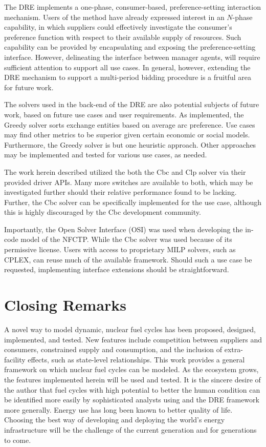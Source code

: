 The DRE implements a one-phase, consumer-based, preference-setting interaction
mechanism. Users of the method have already expressed interest in an $N$-phase
capability, in which suppliers could effectively investigate the consumer's
preference function with respect to their available supply of resources. Such
capability can be provided by encapsulating and exposing the preference-setting
interface. However, delineating the interface between manager agents, will
require sufficient attention to support all use cases. In general, however,
extending the DRE mechanism to support a multi-period bidding procedure is a
fruitful area for future work.

The solvers used in the back-end of the DRE are also potential subjects of
future work, based on future use cases and user requirements. As implemented,
the Greedy solver sorts exchange entities based on average arc preference. Use
cases may find other metrics to be superior given certain economic or social
models. Furthermore, the Greedy solver is but one heuristic approach. Other
approaches may be implemented and tested for various use cases, as needed.

The work herein described utilized the both the Cbc and Clp solver via their
provided driver APIs. Many more switches are available to both, which may be
investigated further should their relative performance found to be
lacking. Further, the Cbc solver can be specifically implemented for the \Cyclus
use case, although this is highly discouraged by the Cbc development community. 

Importantly, the Open Solver Interface (OSI) was used when developing the
in-code model of the NFCTP. While the Cbc solver was used because of its
permissive license. Users with access to proprietary MILP solvers, such as
CPLEX, can reuse much of the available framework. Should such a use case be
requested, implementing interface extensions should be straightforward.

\section{Closing Remarks}

A novel way to model dynamic, nuclear fuel cycles has been proposed, designed,
implemented, and tested. New features include competition between suppliers and
consumers, constrained supply and consumption, and the inclusion of
extra-facility effects, such as state-level relationships. This work provides a
general framework on which nuclear fuel cycles can be modeled. As the \Cyclus
ecosystem grows, the features implemented herein will be used and tested. It is
the sincere desire of the author that fuel cycles with high potential to better
the human condition can be identified more easily by sophisticated analysts
using \Cyclus and the DRE framework more generally. Energy use has long been
known to better quality of life. Choosing the best way of developing and
deploying the world's energy infrastructure will be the challenge of the current
generation and for generations to come.
